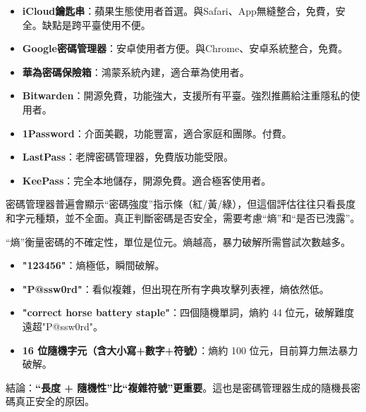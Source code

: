 

\begin{itemize}
  \item \textbf{iCloud鑰匙串}：蘋果生態使用者首選。與Safari、App無縫整合，免費，安全。缺點是跨平臺使用不便。
  \item \textbf{Google密碼管理器}：安卓使用者方便。與Chrome、安卓系統整合，免費。
  \item \textbf{華為密碼保險箱}：鴻蒙系統內建，適合華為使用者。
\end{itemize}


\begin{itemize}
  \item \textbf{Bitwarden}：開源免費，功能強大，支援所有平臺。強烈推薦給注重隱私的使用者。
  \item \textbf{1Password}：介面美觀，功能豐富，適合家庭和團隊。付費。
  \item \textbf{LastPass}：老牌密碼管理器，免費版功能受限。
  \item \textbf{KeePass}：完全本地儲存，開源免費。適合極客使用者。
\end{itemize}


密碼管理器普遍會顯示“密碼強度”指示條（紅/黃/綠），但這個評估往往只看長度和字元種類，並不全面。真正判斷密碼是否安全，需要考慮“熵”和“是否已洩露”。


“熵”衡量密碼的不確定性，單位是位元。熵越高，暴力破解所需嘗試次數越多。

\begin{itemize}
  \item \textbf{"123456"}：熵極低，瞬間破解。
  \item \textbf{"P@ssw0rd"}：看似複雜，但出現在所有字典攻擊列表裡，熵依然低。
  \item \textbf{"correct horse battery staple"}：四個隨機單詞，熵約 44 位元，破解難度遠超"P@ssw0rd"。
  \item \textbf{16 位隨機字元（含大小寫+數字+符號）}：熵約 100 位元，目前算力無法暴力破解。
\end{itemize}

結論：\textbf{“長度 + 隨機性”比“複雜符號”更重要}。這也是密碼管理器生成的隨機長密碼真正安全的原因。


